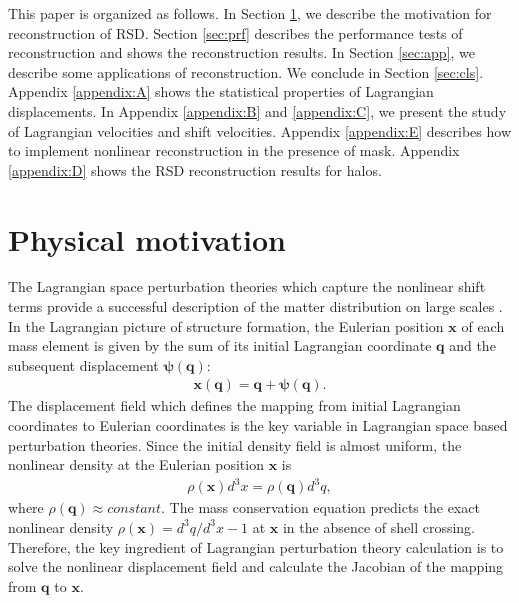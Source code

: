 \documentclass[aps,prx,twocolumn,superscriptaddress,groupedaddress,nofootinbib,amsfont]{revtex4}  %
\newcommand{\bea}{\begin{eqnarray}}
\newcommand{\eea}{\end{eqnarray}}
\newcommand{\bmp}{\bm{\psi}}
\newcommand{\bmx}{\bm{x}}
\newcommand{\bmq}{\bm{q}}
\begin{document}
This paper is organized as follows. In Section \ref{sec:mot}, we describe the 
motivation for reconstruction of RSD.
Section \ref{sec:prf} describes the performance tests of reconstruction and 
shows the reconstruction results.
In Section \ref{sec:app}, we describe some applications of reconstruction.
We conclude in Section \ref{sec:cls}.
Appendix \ref{appendix:A} shows the statistical properties of Lagrangian 
displacements. 
In Appendix \ref{appendix:B} and \ref{appendix:C}, we present the 
study of Lagrangian velocities and shift velocities.
Appendix \ref{appendix:E} describes how to implement nonlinear reconstruction
in the presence of mask.
Appendix \ref{appendix:D} shows the RSD reconstruction results for halos.



\section{Physical motivation}
\label{sec:mot}

The Lagrangian space perturbation theories which capture the nonlinear shift 
terms provide a successful description of the matter distribution on large 
scales \cite{2008M,2008M2,LPT3,2014PSZ,2013CRW,2015VSB,2015SV,2015VWA,2016VCW,
2016matt,2016BSZ,2016BSZ2}.
In the Lagrangian picture of structure formation, the Eulerian position $\bmx$
of each mass element is given by the sum of its initial Lagrangian coordinate 
$\bmq$ and the subsequent displacement $\bmp(\bmq)$:
\bea
\bm{x}(\bm{q})=\bmq+\bm{\psi}(\bmq).
\eea
The displacement field which defines the mapping from initial Lagrangian 
coordinates to Eulerian coordinates is the key variable in Lagrangian space 
based perturbation theories.
Since the initial density field is almost uniform, the nonlinear density at the
Eulerian position $\bmx$ is 
\bea
\rho(\bmx)d^3x=\rho(\bmq)d^3q,
\eea
where $\rho(\bmq)\approx constant$. The mass conservation equation predicts the 
exact nonlinear density $\rho(\bmx)=d^3q/d^3x-1$ at $\bmx$ in the absence of 
shell crossing. Therefore, the key ingredient of Lagrangian perturbation theory
calculation is to solve the nonlinear displacement field and calculate the 
Jacobian of the mapping from $\bmq$ to $\bmx$.
\end{document}
